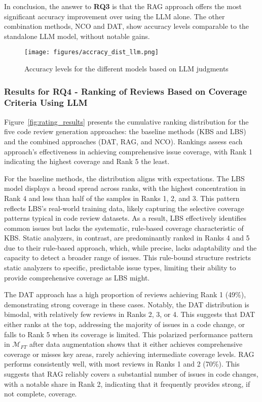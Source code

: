 In conclusion, the answer to \textbf{RQ3} is that the RAG approach offers the most significant accuracy improvement over using the LLM alone. The other combination methods, NCO and DAT, show accuracy levels comparable to the standalone LLM model, without notable gains.


\begin{figure}[htbp!]
  \centering
  \texttt{[image: figures/accracy\_dist\_llm.png]}
  \caption{Accuracy levels for the different models based on LLM judgments}
  \label{fig:llm_judge} 
\end{figure}


\subsubsection{Results for RQ4 - Ranking of Reviews Based on Coverage Criteria Using LLM}
Figure~\ref{fig:rating_results} presents the cumulative ranking distribution for the five code review generation approaches: the baseline methods (KBS and LBS) and the combined approaches (DAT, RAG, and NCO). Rankings assess each approach's effectiveness in achieving comprehensive issue coverage, with Rank 1 indicating the highest coverage and Rank 5 the least.

For the baseline methods, the distribution aligns with expectations. The LBS model displays a broad spread across ranks, with the highest concentration in Rank 4 and less than half of the samples in Ranks 1, 2, and 3. This pattern reflects LBS's real-world training data, likely capturing the selective coverage patterns typical in code review datasets. As a result, LBS effectively identifies common issues but lacks the systematic, rule-based coverage characteristic of KBS. Static analyzers, in contrast, are predominantly ranked in Ranks 4 and 5 due to their rule-based approach, which, while precise, lacks adaptability and the capacity to detect a broader range of issues. This rule-bound structure restricts static analyzers to specific, predictable issue types, limiting their ability to provide comprehensive coverage as LBS might.

The DAT approach has a high proportion of reviews achieving Rank 1 (49\%), demonstrating strong coverage in these cases. Notably, the DAT distribution is bimodal, with relatively few reviews in Ranks 2, 3, or 4. This suggests that DAT either ranks at the top, addressing the majority of issues in a code change, or falls to Rank 5 when its coverage is limited. This polarized performance pattern in \(\mathcal{M}_{FT}\) after data augmentation shows that it either achieves comprehensive coverage or misses key areas, rarely achieving intermediate coverage levels.
RAG performs consistently well, with most reviews in Ranks 1 and 2 (70\%). This suggests that RAG reliably covers a substantial number of issues in code changes, with a notable share in Rank 2, indicating that it frequently provides strong, if not complete, coverage.

